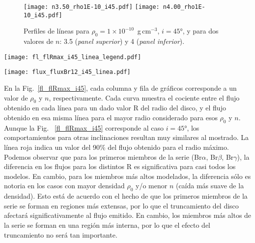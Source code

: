 \documentclass[baaa]{baaa}
\begin{document}
\begin{figure}[!t]
\centering
\texttt{[image: n3.50\_rho1E-10\_i45.pdf]}
\texttt{[image: n4.00\_rho1E-10\_i45.pdf]}
\caption{Perfiles de l\'ineas para $\rho_0=1\times10^{-10}$~g\,cm$^{-3}$, $i=45$°, y para dos valores de $n$: 3.5 (\emph{panel superior}) y 4 (\emph{panel inferior}).}
\label{ejemplos}
\end{figure}

\begin{figure*} 
\centering
\texttt{[image: fl\_flRmax\_i45\_linea\_legend.pdf]}
\caption{Cociente entre el flujo de l\'inea correspondiente a cada radio R y el obtenido considerando el radio m\'aximo de cada modelo. La l\'inea roja indica un 90\% del flujo correspondiente al radio m\'aximo.}
\label{fl_flRmax_i45}
\end{figure*}

\begin{figure*} 
\centering
\texttt{[image: flux\_fluxBr12\_i45\_linea.pdf]}
\caption{Cociente entre el flujo de cada l\'inea y el correspondiente a Br12.}
\label{flux_fluxBr12_i45}
\end{figure*}


En la Fig.~\ref{fl_flRmax_i45}, cada columna y fila de gr\'aficos corresponde a un valor de $\rho_0$ y $n$, respectivamente. Cada curva muestra el cociente entre el flujo obtenido en cada l\'inea para un dado valor R del radio del disco, y el flujo obtenido en esa misma l\'inea para el mayor radio considerado para esos $\rho_0$ y $n$. Aunque la Fig. ~\ref{fl_flRmax_i45} corresponde al caso $i=45$°, los comportamientos para otras inclinaciones resultan muy similares al mostrado. La l\'inea roja indica un valor del 90\% del flujo obtenido para el radio m\'aximo. Podemos observar que para los primeros miembros de la serie (Br$\alpha$, Br$\beta$, Br$\gamma$), la diferencia en los flujos para los distintos R es significativa para casi todos los modelos. En cambio, para los miembros m\'as altos modelados, la diferencia s\'olo es notoria en los casos con mayor densidad $\rho_0$ y/o menor $n$ (ca\'ida m\'as suave de la densidad). Esto est\'a de acuerdo con el hecho de que los primeros miembros de la serie se forman en regiones m\'as extensas, por lo que el truncamiento del disco afectar\'a significativamente al flujo emitido. En cambio, los miembros m\'as altos de la serie se forman en una regi\'on m\'as interna, por lo que el efecto del truncamiento no ser\'a tan importante. 
\end{document}
